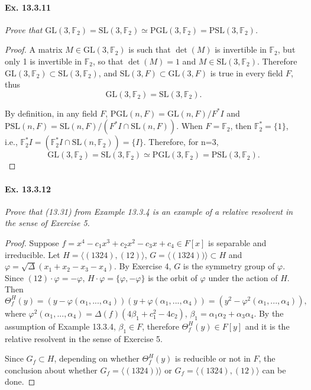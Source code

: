 \documentclass[11pt,a4paper]{article}
\newcommand{\F}{\mathbb{F}}
\begin{document}
\paragraph{Ex. 13.3.11}

{\it Prove that  $\mathrm{GL}(3,\mathbb{F}_2)=\mathrm{SL}(3,\mathbb{F}_2) \simeq \mathrm{PGL}(3,\mathbb{F}_2)=\mathrm{PSL}(3,\mathbb{F}_2)$. 

\begin{proof}
A matrix $M \in \mathrm{GL}(3,\mathbb{F}_2)$ is such that $\det(M)$ is invertible in $\F_2$, but only 1 is invertible in $\F_2$, so that $\det(M) = 1$ and $M \in \mathrm{SL}(3,\mathbb{F}_2)$. Therefore $\mathrm{GL}(3,\mathbb{F}_2) \subset \mathrm{SL}(3,\mathbb{F}_2)$, and $ \mathrm{SL}(3,F) \subset \mathrm{GL}(3,F)$ is true in every field $F$, thus
$$\mathrm{GL}(3,\mathbb{F}_2)=\mathrm{SL}(3,\mathbb{F}_2).$$

By definition, in any field $F$, $\mathrm{PGL}(n,F)=\mathrm{GL}(n,F)/F^*I$ and $\mathrm{PSL}(n,F)=\mathrm{SL}(n,F)/(F^*I\cap \mathrm{SL}(n,F))$. When $F=\mathbb{F}_2$, then $\mathbb{F}_2^*=\{1\}$, i.e., $\mathbb{F}_2^*I=(\mathbb{F}_2^*I\cap \mathrm{SL}(n,\mathbb{F}_2))=\{I\}$. Therefore, for n=3,
$$\mathrm{GL}(3,\mathbb{F}_2)=\mathrm{SL}(3,\mathbb{F}_2) \simeq \mathrm{PGL}(3,\mathbb{F}_2)=\mathrm{PSL}(3,\mathbb{F}_2).$$
\end{proof}
}

\paragraph{Ex. 13.3.12}

{\it Prove that  (13.31) from Example 13.3.4 is an example of a relative resolvent in the sense of Exercise 5. 

\begin{proof}
Suppose $f=x^4-c_1x^3+c_2x^2-c_3x+c_4 \in F[x]$ is separable and irreducible.
Let $H=\langle (1324),(12) \rangle$,  $G=\langle (1324)) \rangle \subset H$ and $\varphi=\sqrt{\Delta}(x_1+x_2-x_3-x_4)$. By Exercise 4, $G$ is the symmetry group of $\varphi$. Since $(12)\cdot \varphi=-\varphi$,  $H \cdot \varphi = \{\varphi,-\varphi\}$ is the orbit of $\varphi$ under the action of $H$.  Then $$\Theta_f^H(y)=( y - \varphi(\alpha_1,...,\alpha_4))( y + \varphi(\alpha_1,...,\alpha_4))=( y^2 - \varphi^2(\alpha_1,...,\alpha_4)),$$
where $\varphi^2(\alpha_1,...,\alpha_4)=\Delta(f)(4\beta_1+c_1^2-4c_2)$, $\beta_1=\alpha_1\alpha_2+\alpha_3\alpha_4$. By the assumption of Example 13.3.4, $\beta_1 \in F$, therefore $\Theta_f^H(y) \in F[y]$ and it is the relative resolvent in the sense of Exercise 5. 

Since $G_f \subset H$, depending on whether $\Theta_f^H(y)$ is reducible or not in $F$, the conclusion about whether $G_f=\langle (1324)) \rangle$ or $G_f=\langle (1324),(12) \rangle$ can be done.  

\end{proof}
}
\end{document}
